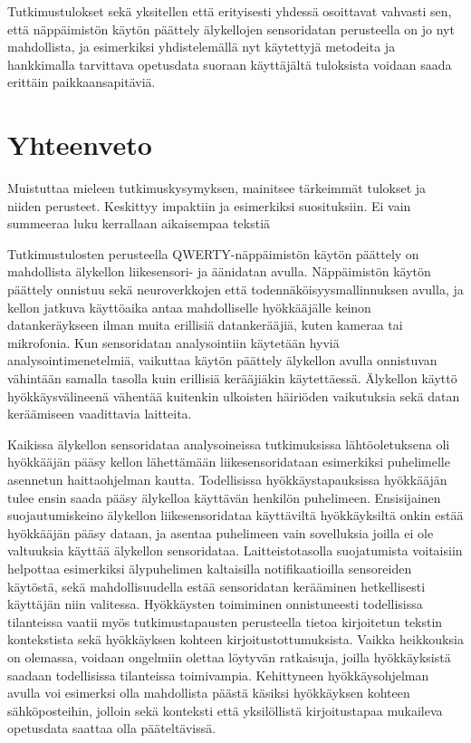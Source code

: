 \documentclass[finnish]{tktltiki2}
\theoremstyle{definition}
\theoremstyle{remark}
\begin{document}
Tutkimustulokset sekä yksitellen että erityisesti yhdessä osoittavat vahvasti sen, että näppäimistön käytön päättely älykellojen sensoridatan perusteella on jo nyt mahdollista, ja esimerkiksi yhdistelemällä nyt käytettyjä metodeita ja hankkimalla tarvittava opetusdata suoraan käyttäjältä tuloksista voidaan saada erittäin paikkaansapitäviä.

\section{Yhteenveto}

Muistuttaa mieleen tutkimuskysymyksen, mainitsee tärkeimmät tulokset ja niiden perusteet. Keskittyy impaktiin ja esimerkiksi suosituksiin. Ei vain summeeraa luku kerrallaan aikaisempaa tekstiä


Tutkimustulosten perusteella QWERTY-näppäimistön käytön päättely on mahdollista älykellon liikesensori- ja äänidatan avulla. Näppäimistön käytön päättely onnistuu sekä neuroverkkojen että todennäköisyysmallinnuksen avulla, ja kellon jatkuva käyttöaika antaa mahdolliselle hyökkääjälle keinon datankeräykseen ilman muita erillisiä datankerääjiä, kuten kameraa tai mikrofonia. Kun sensoridatan analysointiin käytetään hyviä analysointimenetelmiä, vaikuttaa käytön päättely älykellon avulla onnistuvan vähintään samalla tasolla kuin erillisiä kerääjiäkin käytettäessä. Älykellon käyttö hyökkäysvälineenä vähentää kuitenkin ulkoisten häiriöden vaikutuksia sekä datan keräämiseen vaadittavia laitteita. 

Kaikissa älykellon sensoridataa analysoineissa tutkimuksissa lähtöoletuksena oli hyökkääjän pääsy kellon lähettämään liikesensoridataan esimerkiksi puhelimelle asennetun haittaohjelman kautta. Todellisissa hyökkäystapauksissa hyökkääjän tulee ensin saada pääsy älykelloa käyttävän henkilön puhelimeen. Ensisijainen suojautumiskeino älykellon liikesensoridataa käyttäviltä hyökkäyksiltä onkin estää hyökkääjän pääsy dataan, ja asentaa puhelimeen vain sovelluksia joilla ei ole valtuuksia käyttää älykellon sensoridataa. 
Laitteistotasolla suojatumista voitaisiin helpottaa esimerkiksi älypuhelimen kaltaisilla notifikaatioilla sensoreiden käytöstä, sekä mahdollisuudella estää sensoridatan kerääminen hetkellisesti käyttäjän niin valitessa. Hyökkäysten toimiminen onnistuneesti todellisissa tilanteissa vaatii myös tutkimustapausten perusteella tietoa kirjoitetun tekstin kontekstista sekä hyökkäyksen kohteen kirjoitustottumuksista. Vaikka heikkouksia on olemassa, voidaan ongelmiin olettaa löytyvän ratkaisuja, joilla hyökkäyksistä saadaan todellisissa tilanteissa toimivampia. Kehittyneen hyökkäysohjelman avulla voi esimerksi olla mahdollista päästä käsiksi hyökkäyksen kohteen sähköposteihin, jolloin sekä konteksti että yksilöllistä kirjoitustapaa mukaileva opetusdata saattaa olla pääteltävissä.
\end{document}
